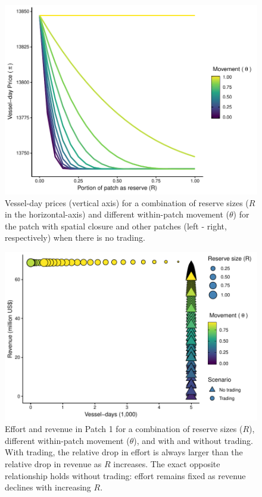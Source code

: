 \documentclass[12pt]{article}
\begin{document}
\begin{figure}
\centering
\includegraphics{img/vessel_day_price_with_trading_plot.pdf}
\caption{\label{fig:vessel_day_price_with_trading_plot}Vessel-day prices (vertical axis) for a combination of reserve sizes ($R$ in the horizontal-axis) and different within-patch movement ($\theta$) for the patch with spatial closure and other patches (left - right, respectively) when there is no trading.}
\end{figure}

\begin{figure}
	\centering
	\includegraphics{img/effort_and_revenues.pdf}
	\caption{\label{fig:effort_and_revenues}Effort and revenue in Patch 1 for a combination of reserve sizes ($R$), different within-patch movement ($\theta$), and with and without trading. With trading, the relative drop in effort is always larger than the relative drop in revenue as $R$ increases. The exact opposite relationship holds without trading: effort remains fixed as revenue declines with increasing $R$.}
\end{figure}
\end{document}
